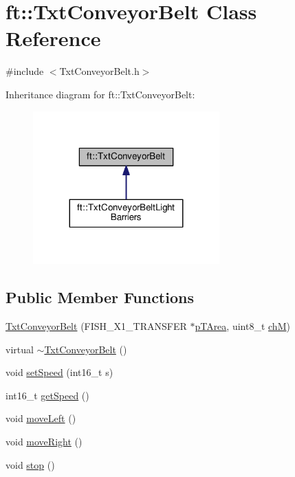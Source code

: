 \hypertarget{classft_1_1_txt_conveyor_belt}{}\section{ft\+:\+:Txt\+Conveyor\+Belt Class Reference}
\label{classft_1_1_txt_conveyor_belt}


{\ttfamily \#include $<$Txt\+Conveyor\+Belt.\+h$>$}



Inheritance diagram for ft\+:\+:Txt\+Conveyor\+Belt\+:
\nopagebreak
\begin{figure}[H]
\begin{center}
\leavevmode
\includegraphics[width=203pt]{classft_1_1_txt_conveyor_belt__inherit__graph}
\end{center}
\end{figure}
\subsection*{Public Member Functions}
\begin{DoxyCompactItemize}
\item 
\hyperlink{classft_1_1_txt_conveyor_belt_aa0c6d359db7e29ef06f2d1f7aede6347}{Txt\+Conveyor\+Belt} (F\+I\+S\+H\+\_\+\+X1\+\_\+\+T\+R\+A\+N\+S\+F\+ER $\ast$\hyperlink{classft_1_1_txt_conveyor_belt_aee7d4f810563d6e97a64aaa8bf0dcce0}{p\+T\+Area}, uint8\+\_\+t \hyperlink{classft_1_1_txt_conveyor_belt_a25369fe466fdbe778e9ffa25c0ae6d0f}{chM})
\item 
virtual \hyperlink{classft_1_1_txt_conveyor_belt_ab1d5269a7deaf5aa0533e543fb668e76}{$\sim$\+Txt\+Conveyor\+Belt} ()
\item 
void \hyperlink{classft_1_1_txt_conveyor_belt_abb63916dcdc8a7c6134271e478103394}{set\+Speed} (int16\+\_\+t s)
\item 
int16\+\_\+t \hyperlink{classft_1_1_txt_conveyor_belt_a9afad7b1fcadd2f97886df29e232d2b1}{get\+Speed} ()
\item 
void \hyperlink{classft_1_1_txt_conveyor_belt_a0dbd0de0d73bbc16711b46985ecd5744}{move\+Left} ()
\item 
void \hyperlink{classft_1_1_txt_conveyor_belt_a55944a69d517ca45240e8561bf79d422}{move\+Right} ()
\item 
void \hyperlink{classft_1_1_txt_conveyor_belt_a645b5ecc1e6e7a7efb5ee281ca252aa5}{stop} ()
\end{DoxyCompactItemize}
